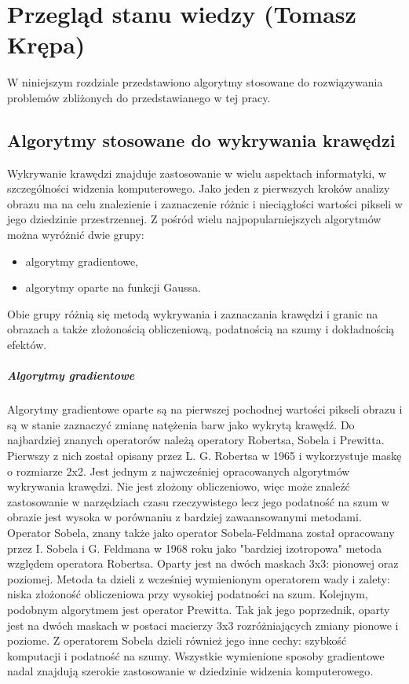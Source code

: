 \chapter{Przegląd stanu wiedzy (Tomasz Krępa)}
\label{chap:literature}

W niniejszym rozdziale przedstawiono algorytmy stosowane do rozwiązywania problemów zbliżonych do przedstawianego w tej pracy.

\section{Algorytmy stosowane do wykrywania krawędzi}

Wykrywanie krawędzi znajduje zastosowanie w wielu aspektach informatyki, w szczególności widzenia komputerowego. Jako jeden z pierwszych kroków analizy obrazu ma na celu znalezienie i zaznaczenie różnic i nieciągłości wartości pikseli w jego dziedzinie przestrzennej. Z pośród wielu najpopularniejszych algorytmów można wyróżnić dwie grupy\cite{survey_on_edge_detection}:
\begin{itemize}
    \item algorytmy gradientowe,
    \item algorytmy oparte na funkcji Gaussa.
\end{itemize}
Obie grupy różnią się metodą wykrywania i zaznaczania krawędzi i granic na obrazach a także złożonością obliczeniową, podatnością na szumy i dokładnością efektów.

\paragraph{Algorytmy gradientowe}

Algorytmy gradientowe oparte są na pierwszej pochodnej wartości pikseli obrazu i są w stanie zaznaczyć zmianę natężenia barw jako wykrytą krawędź\cite{survey_on_edge_detection}. Do najbardziej znanych operatorów należą operatory Robertsa, Sobela i Prewitta. Pierwszy z nich został opisany przez L. G. Robertsa w 1965 i wykorzystuje maskę o rozmiarze 2x2. Jest jednym z najwcześniej opracowanych algorytmów wykrywania krawędzi. Nie jest złożony obliczeniowo, więc może znaleźć zastosowanie w narzędziach czasu rzeczywistego lecz jego podatność na szum w obrazie jest wysoka w porównaniu z bardziej zawaansowanymi metodami\cite{survey_on_edge_detection}. Operator Sobela, znany także jako operator Sobela-Feldmana został opracowany przez I. Sobela i G. Feldmana w 1968 roku jako "bardziej izotropowa" metoda względem operatora Robertsa\cite{sobel_feldman}. Oparty jest na dwóch maskach 3x3: pionowej oraz poziomej. Metoda ta dzieli z wcześniej wymienionym operatorem wady i zalety: niska złożoność obliczeniowa przy wysokiej podatności na szum\cite{survey_on_edge_detection}. Kolejnym, podobnym algorytmem jest operator Prewitta. Tak jak jego poprzednik, oparty jest na dwóch maskach w postaci macierzy 3x3 rozróżniających zmiany pionowe i poziome. Z operatorem Sobela dzieli również jego inne cechy: szybkość komputacji i podatność na szumy\cite{survey_on_edge_detection}\cite{prewitt}. Wszystkie wymienione sposoby gradientowe nadal znajdują szerokie zastosowanie w dziedzinie widzenia komputerowego.

